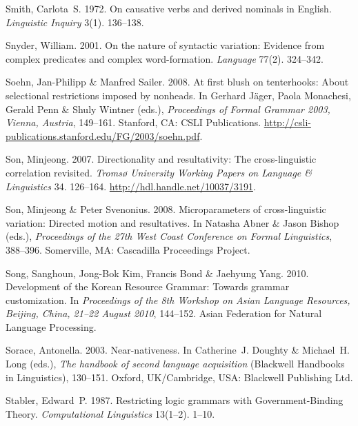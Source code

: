 \begin{thebibliography}{1420}
Smith, Carlota~S. 1972.
\newblock On causative verbs and derived nominals in {English}.
\newblock \emph{Linguistic Inquiry} 3(1). 136--138.

Snyder, William. 2001.
\newblock On the nature of syntactic variation: {Evidence} from complex
  predicates and complex word-formation.
\newblock \emph{Language} 77(2). 324--342.

Soehn, Jan-Philipp \& Manfred Sailer. 2008.
\newblock At first blush on tenterhooks: {About} selectional restrictions
  imposed by nonheads.
\newblock In Gerhard J{\"a}ger, Paola Monachesi, Gerald Penn \& Shuly Wintner
  (eds.), \emph{Proceedings of {Formal Grammar 2003, Vienna, Austria}},
  149--161. Stanford, CA: CSLI Publications.
\newblock
  \urlprefix\url{http://csli-publications.stanford.edu/FG/2003/soehn.pdf}.

Son, Minjeong. 2007.
\newblock Directionality and resultativity: {The} cross-linguistic correlation
  revisited.
\newblock \emph{Troms{\o} University Working Papers on Language \& Linguistics}
  34. 126--164.
\newblock \urlprefix\url{http://hdl.handle.net/10037/3191}.

Son, Minjeong \& Peter Svenonius. 2008.
\newblock Microparameters of cross-linguistic variation: {Directed} motion and
  resultatives.
\newblock In Natasha Abner \& Jason Bishop (eds.), \emph{Proceedings of the
  {27th West Coast Conference on Formal Linguistics}}, 388--396. Somerville,
  MA: Cascadilla Proceedings Project.

Song, Sanghoun, Jong-Bok Kim, Francis Bond \& Jaehyung Yang. 2010.
\newblock Development of the {Korean Resource Grammar}: {Towards} grammar
  customization.
\newblock In \emph{Proceedings of the {8th Workshop on Asian Language
  Resources, Beijing, China, 21--22 August 2010}}, 144--152. Asian Federation
  for Natural Language Processing.

Sorace, Antonella. 2003.
\newblock Near-nativeness.
\newblock In Catherine~J. Doughty \& Michael~H. Long (eds.), \emph{The handbook
  of second language acquisition}  (Blackwell Handbooks in Linguistics),
  130--151. Oxford, UK/Cambridge, USA: Blackwell Publishing Ltd.

Stabler, Edward~P. 1987.
\newblock Restricting logic grammars with {Government-Binding Theory}.
\newblock \emph{Computational Linguistics} 13(1--2). 1--10.


\end{thebibliography}
